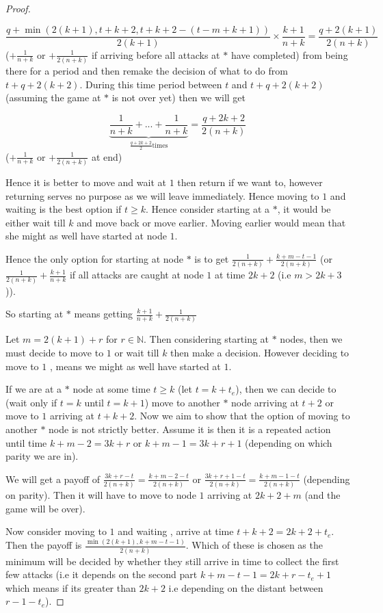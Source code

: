 \documentclass[a4paper,10pt]{article}
\theoremstyle{definition}
\theoremstyle{definition}
\theoremstyle{remark}
\theoremstyle{definition}
\begin{document}
\begin{proof}
\begin{itemize}
$$\frac{q+ \min(2(k+1),t+k+2,t+k+2-(t-m+k+1))}{2(k+1)} \times \frac{k+1}{n+k} =\frac{q+2(k+1)}{2(n+k)} $$ ($+\frac{1}{n+k}$ or $+\frac{1}{2(n+k)}$ if arriving before all attacks at $*$ have completed) from being there for a period and then remake the decision of what to do from $t+q+2(k+2)$. During this time period between $t$ and $t+q+2(k+2)$ (assuming the game at $*$ is not over yet) then we will get

$$\underbrace{\frac{1}{n+k}+...+\frac{1}{n+k}}_{\frac{q+2k+2}{2} \text{times}}=\frac{q+2k+2}{2(n+k)}$$ ($+\frac{1}{n+k}$ or $+\frac{1}{2(n+k)}$
at end)

Hence it is better to move and wait at $1$ then return if we want to, however returning serves no purpose as we will leave immediately. Hence moving to $1$ and waiting is the best option if $t \geq k$. Hence consider starting at a $*$, it would be either wait till $k$ and move back or move earlier. Moving earlier would mean that she might as well have started at node $1$.

Hence the only option for starting at node $*$ is to get $\frac{1}{2(n+k)}+\frac{k+m-t-1}{2(n+k)}$ (or $\frac{1}{2(n+k)}+\frac{k+1}{n+k}$ if all attacks are caught at node $1$ at time $2k+2$ (i.e $m > 2k+3$)).

So starting at $*$ means getting $\frac{k+1}{n+k}+\frac{1}{2(n+k)}$ 

\end{itemize}


Let $m=2(k+1)+r$ for $r \in \mathbb{N}$.
Then considering starting at $*$ nodes, then we must decide to move to $1$ or wait till $k$ then make a decision. However deciding to move to $1$ , means we might as well have started at $1$.

If we are at a $*$ node at some time $t \geq k$ (let $t=k+t_{e}$), then we can decide to (wait only if $t=k$ until $t=k+1$) move to another $*$ node arriving at $t+2$ or move to $1$ arriving at $t+k+2$. Now we aim to show that the option of moving to another $*$ node is not strictly better. Assume it is then it is a repeated action until time $k+m-2=3k+r$ or $k+m-1=3k+r+1$ (depending on which parity we are in).

We will get a payoff of $\frac{3k+r-t}{2(n+k)}=\frac{k+m-2-t}{2(n+k)}$ or $\frac{3k+r+1-t}{2(n+k)}=\frac{k+m-1-t}{2(n+k)}$ (depending on parity). Then it will have to move to node $1$ arriving at $2k+2+m$ (and the game will be over).

Now consider moving to $1$ and waiting , arrive at time $t+k+2=2k+2+t_{e}$. Then the payoff is $\frac{\min(2(k+1),k+m-t-1)}{2(n+k)}$. Which of these is chosen as the minimum will be decided by whether they still arrive in time to collect the first few attacks (i.e it depends on the second part $k+m-t-1=2k+r-t_{e}+1$ which means if its greater than $2k+2$ i.e depending on the distant between $r-1-t_{e}$).


\end{proof}
\end{document}
